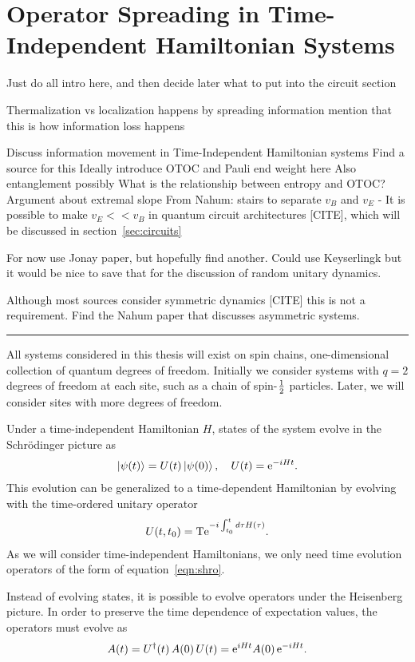 \section{Operator Spreading in Time-Independent Hamiltonian Systems} \label{sec:opsp}

Just do all intro here, and then decide later what to put into the circuit section

Thermalization 
  vs localization 
  happens by spreading information
  mention that this is how information loss happens

Discuss information movement in Time-Independent Hamiltonian systems
  Find a source for this
  Ideally introduce OTOC and Pauli end weight here
  Also entanglement possibly
  What is the relationship between entropy and OTOC?
  Argument about extremal slope
    From Nahum: stairs to separate $v_B$ and $v_E$ - It is possible to make $v_E << v_B$ in quantum circuit architectures [CITE], which will be discussed in section~\ref{sec:circuits}
    

For now use Jonay paper, but hopefully find another. Could use Keyserlingk but it would be nice to save that for the discussion of random unitary dynamics.

Although most sources consider symmetric dynamics [CITE] this is not a requirement. Find the Nahum paper that discusses asymmetric systems.

\hrule

All systems considered in this thesis will exist on spin chains, one-dimensional collection of quantum degrees of freedom. Initially we consider systems with $q=2$ degrees of freedom at each site, such as a chain of spin-$\frac{1}{2}$ particles. Later, we will consider sites with more degrees of freedom. 

Under a time-independent Hamiltonian $H$, states of the system evolve in the Schr\"odinger picture as 
\begin{align}
\left|\psi(t)\right\rangle = U(t)\left|\psi(0)\right\rangle,\quad U(t) = \text{e}^{-iHt}. \label{eqn:shro}
\end{align}
This evolution can be generalized to a time-dependent Hamiltonian by evolving with the time-ordered unitary operator
\begin{align}
U(t,t_0) = \text{T}\text{e}^{-i\int_{t_0}^td\tau H(\tau)}.\nonumber
\end{align}
As we will consider time-independent Hamiltonians, we only need time evolution operators of the form of equation~\ref{eqn:shro}.

Instead of evolving states, it is possible to evolve operators under the Heisenberg picture. In order to preserve the time dependence of expectation values, the operators must evolve as 
\begin{align}
A(t) = U^\dag(t)\,A(0)\,U(t) = \text{e}^{iHt}A(0)\,\text{e}^{-iHt}.\label{eqn:heis}
\end{align}

